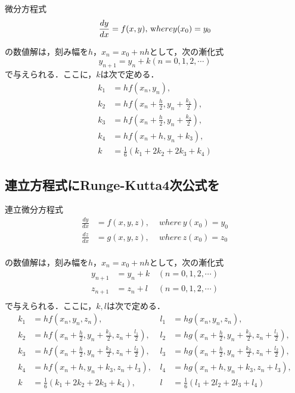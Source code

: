 \documentclass[11pt]{article}
\begin{document}
微分方程式 \[
\frac{dy}{dx} = f(x,y), \, {\textrm where}y(x_0)=y_0
\]

の数値解は，刻み幅を\(h\)，\(x_n=x_0+nh\)として，次の漸化式 \[
y_{n+1} = y_n +k (n=0,1,2,\cdots)
\] で与えられる．ここに，\(k\)は次で定める． \[
\begin{aligned}
k_1 & = hf(x_n,y_n), \\
k_2 & = hf(x_n+\frac{h}{2}, y_n+\frac{k_1}{2}), \\
k_3 & = hf(x_n+\frac{h}{2}, y_n+\frac{k_2}{2}), \\
k_4 & = hf(x_n+h, y_n+k_3), \\
k & = \frac{1}{6}(k_1+2k_2+2k_3+k_4)
\end{aligned}
\]

    \subsection{連立方程式にRunge-Kutta4次公式を}\label{ux9023ux7acbux65b9ux7a0bux5f0fux306brunge-kutta4ux6b21ux516cux5f0fux3092}

連立微分方程式 \[
\begin{aligned}
\frac{dy}{dx} &= f(x,y,z), &\, \, where \, y(x_0)=y_0 \\
\frac{dz}{dx} &= g(x,y,z), &\, \, where \, z(x_0)=z_0 \\
\end{aligned}
\]

の数値解は，刻み幅を\(h\)，\(x_n=x_0+nh\)として，次の漸化式 \[
\begin{aligned}
y_{n+1} & = y_n +k &\, (n=0,1,2,\cdots) \\
z_{n+1} & = z_n +l &\, (n=0,1,2,\cdots) \\
\end{aligned}
\] で与えられる．ここに，\(k,l\)は次で定める． \[
\begin{aligned}
k_1 &= hf(x_n,y_n,z_n), \,
&l_1 &= hg(x_n,y_n,z_n), \\
k_2 &= hf(x_n+\frac{h}{2}, y_n+\frac{k_1}{2}, z_n+\frac{l_1}{2}), \,
&l_2 &= hg(x_n+\frac{h}{2}, y_n+\frac{k_1}{2}, z_n+\frac{l_1}{2}), \\
k_3 &= hf(x_n+\frac{h}{2}, y_n+\frac{k_2}{2}, z_n+\frac{l_2}{2}), \,
&l_3 &= hg(x_n+\frac{h}{2}, y_n+\frac{k_2}{2}, z_n+\frac{l_2}{2}), \\
k_4 &= hf(x_n+h, y_n+k_3, z_n+l_3), \,
&l_4 &= hg(x_n+h, y_n+k_3, z_n+l_3), \\
k &= \frac{1}{6}(k_1+2k_2+2k_3+k_4), \,
&l &= \frac{1}{6}(l_1+2l_2+2l_3+l_4)
\end{aligned}
\]
\end{document}
